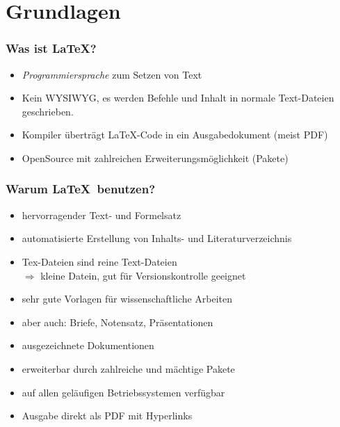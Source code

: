 \section{Grundlagen}
\begin{frame}
    \frametitle{Was ist \LaTeX?}
    \begin{itemize}
        \item \emph{Programmiersprache} zum Setzen von Text
        \item Kein WYSIWYG, es werden Befehle und Inhalt in normale Text-Dateien geschrieben.
        \item Kompiler überträgt \LaTeX-Code in ein Ausgabedokument (meist PDF)
        \item OpenSource mit zahlreichen Erweiterungsmöglichkeit (Pakete)
    \end{itemize}
\end{frame}
\begin{frame}
    \frametitle{Warum \LaTeX \ benutzen?}
    \begin{itemize}
        \item hervorragender Text- und Formelsatz
        \item automatisierte Erstellung von Inhalts- und Literaturverzeichnis
        \item Tex-Dateien sind reine Text-Dateien \\
              $\Rightarrow$ kleine Datein, gut für Versionskontrolle geeignet
        \item sehr gute Vorlagen für wissenschaftliche Arbeiten 
        \item aber auch: Briefe, Notensatz, Präsentationen 
        \item ausgezeichnete Dokumentionen
        \item erweiterbar durch zahlreiche und mächtige Pakete
        \item auf allen geläufigen Betriebssystemen verfügbar
        \item Ausgabe direkt als PDF mit Hyperlinks
    \end{itemize}
\end{frame}

